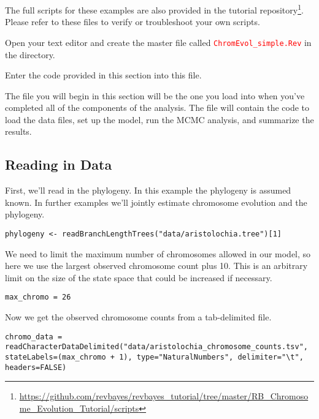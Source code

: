 The full scripts for these examples are also provided in the \RevBayes tutorial repository\footnote{\url{https://github.com/revbayes/revbayes_tutorial/tree/master/RB_Chromosome_Evolution_Tutorial/scripts}}. 
Please refer to these files to verify or troubleshoot your own scripts. 

{\begin{framed}
Open your text editor and create the master \Rev file called {\textcolor{red}{\texttt{ChromEvol\_simple.Rev}}} in the  directory.

Enter the \Rev code provided in this section into this file.
\end{framed}}

The file you will begin in this section will be the one you load into \RevBayes when you've completed all of the components of the analysis. The file will contain the \Rev code to load the data files, set up the model, run the MCMC analysis, and summarize the results.

\medskip
\subsection{Reading in Data}\label{subsub:Exercise-LoadData}

First, we'll read in the phylogeny. In this example the phylogeny is assumed known. In further
examples we'll jointly estimate chromosome evolution and the phylogeny.
{\tt \begin{snugshade*}
\begin{lstlisting}
phylogeny <- readBranchLengthTrees("data/aristolochia.tree")[1]
\end{lstlisting}
\end{snugshade*}}

We need to limit the maximum number of chromosomes allowed in our model,
so here we use the largest observed chromosome count plus 10. This is an arbitrary limit
on the size of the state space that could be increased if necessary.
{\tt \begin{snugshade*}
\begin{lstlisting}
max_chromo = 26 
\end{lstlisting}
\end{snugshade*}}

Now we get the observed chromosome counts from a tab-delimited file.
{\tt \begin{snugshade*}
\begin{lstlisting}
chromo_data = readCharacterDataDelimited("data/aristolochia_chromosome_counts.tsv", stateLabels=(max_chromo + 1), type="NaturalNumbers", delimiter="\t", headers=FALSE)
\end{lstlisting}
\end{snugshade*}}


